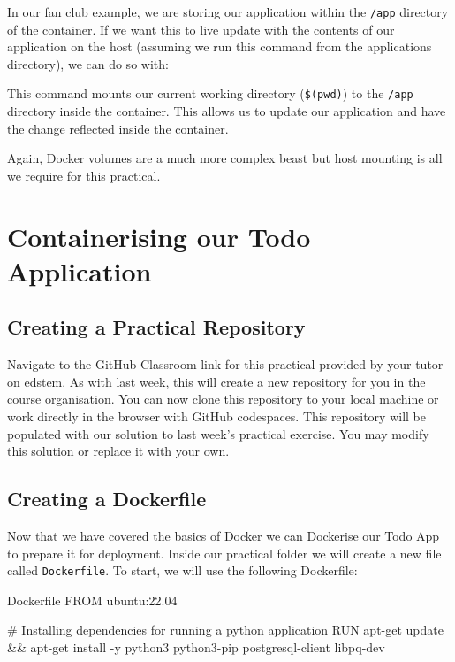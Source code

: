 \documentclass{csse4400}
\begin{document}
In our fan club example,
we are storing our application within the \texttt{/app} directory of the container.
If we want this to live update with the contents of our application on the host (assuming we run this command from the applications directory), we can do so with:

This command mounts our current working directory (\texttt{\$(pwd)}) to the \texttt{/app} directory inside the container.
This allows us to update our application and have the change reflected inside the container.

Again, Docker volumes are a much more complex beast but host mounting is all we require for this practical.

\section{Containerising our Todo Application}


\subsection{Creating a Practical Repository}
Navigate to the GitHub Classroom link for this practical provided by your tutor on edstem.
As with last week, this will create a new repository for you in the course organisation.
You can now clone this repository to your local machine or work directly in the browser with GitHub codespaces.
This repository will be populated with our solution to last week's practical exercise.
You may modify this solution or replace it with your own.

\subsection{Creating a Dockerfile}

Now that we have covered the basics of Docker we can Dockerise our Todo App to prepare it for deployment.
Inside our practical folder we will create a new file called \texttt{Dockerfile}.
To start, we will use the following Dockerfile:

\begin{code}[language=docker,numbers=none]{Dockerfile}
FROM ubuntu:22.04

# Installing dependencies for running a python application
RUN apt-get update && apt-get install -y python3 python3-pip postgresql-client libpq-dev
\end{code}
\end{document}
